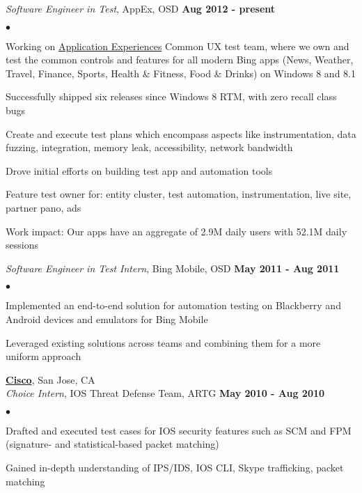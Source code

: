 \documentclass[margin,line]{res}
\newenvironment{list2}
  {\vspace{-4mm}
   \begin{list}{$\bullet$}{
     \setlength{\itemsep}{0in}
     \setlength{\parsep}{0in} \setlength{\parskip}{0in}
     \setlength{\topsep}{0in} \setlength{\partopsep}{0in}
     \setlength{\leftmargin}{0.18in}}}
  {\end{list}}
\begin{document}
\begin{resume}
{\em Software Engineer in Test}, AppEx, OSD                       \hfill {\bf Aug 2012 - present} \\
\begin{list2}
\item Working on \href{http://www.zdnet.com/microsofts-latest-search-share-attack-plan-focus-on-mobile-apps-7000008908/}{Application Experiences}
  Common UX test team, where we own and test the common controls and features for all modern Bing apps
  (News, Weather, Travel, Finance, Sports, Health \& Fitness, Food \& Drinks) on Windows 8 and 8.1
\item Successfully shipped six releases since Windows 8 RTM, with zero recall class bugs
\item Create and execute test plans which encompass aspects like instrumentation, data fuzzing, integration,
  memory leak, accessibility, network bandwidth
\item Drove initial efforts on building test app and automation tools
\item Feature test owner for: entity cluster, test automation, instrumentation, live site, partner pano, ads
\item Work impact: Our apps have an aggregate of 2.9M daily users with 52.1M daily sessions
\end{list2}

{\em Software Engineer in Test Intern}, Bing Mobile, OSD          \hfill {\bf May 2011 - Aug 2011} \\
\begin{list2}
\item Implemented an end-to-end solution for automation testing on Blackberry and Android devices 
  and emulators for Bing Mobile
\item Leveraged existing solutions across teams and combining them for a more uniform approach
\end{list2}

{\bf \href{http://cisco.com}{Cisco}}, San Jose, CA \\
{\em Choice Intern}, IOS Threat Defense Team, ARTG                \hfill {\bf May 2010 - Aug 2010}\\
\begin{list2}
\item Drafted and executed test cases for IOS security features such as SCM and FPM
  (signature- and statistical-based packet matching)
\item Gained in-depth understanding of IPS/IDS, IOS CLI, Skype trafficking, packet matching
\end{list2}


\end{resume}
\end{document}
